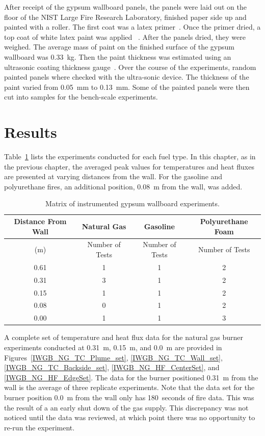 \documentclass[twoside]{uocthesis}
\begin{document}
{After receipt of the gypsum wallboard panels, the panels were laid out on the floor of the NIST Large Fire Research Laboratory, finished paper side up and painted with a roller.  The first coat was a latex primer~\cite{Latex_Primer}.  Once the primer dried, a top coat of white latex paint was applied ~\cite{Latex_Paint}.  After the panels dried, they were weighed. The average mass of paint on the finished surface of the gypsum wallboard was 0.33~kg. Then the paint thickness was estimated using an ultrasonic coating thickness gauge~\cite{defelsko}.  Over the course of the experiments, random painted panels where checked with the ultra-sonic device. The thickness of the paint varied from 0.05~mm to 0.13~mm.  Some of the painted panels were then cut into samples for the bench-scale experiments.


\section{Results}

Table~\ref{tab:IWGB_experiments} lists the experiments conducted for each fuel type.  In this chapter, as in the previous chapter, the averaged peak values for temperatures and heat fluxes are presented at varying distances from the wall.  For the gasoline and polyurethane fires, an additional position, 0.08~m from the wall, was added.

\begin{table}[ht!]
	\centering
	\begin{tabular}{|c|c|c|c|}
		\hline Distance From Wall  	& Natural Gas 		& Gasoline			& Polyurethane Foam \\
		\hline (m) 					& Number of Tests 	& Number of Tests  	& Number of Tests 	\\ 
		\hline 0.61 				& 1 				& 1 				& 2 			 	\\
		\hline 0.31					& 3	 				& 1					& 2 			 	\\
		\hline 0.15					& 1				 	& 1					& 2 			 	\\
		\hline 0.08					& 0 				& 1 				& 2 	 			\\
		\hline 0.00					& 1 				& 1 				& 3 	 			\\
		\hline
	\end{tabular}
	\caption[Matrix of instrumented gypsum wallboard experiments.]{Matrix of instrumented gypsum wallboard experiments.}
	\label{tab:IWGB_experiments}
\end{table}

A complete set of temperature and heat flux data for the natural gas burner experiments conducted at 0.31~m, 0.15~m, and 0.0~m are provided in Figures~\ref{IWGB_NG_TC_Plume_set}, \ref{IWGB_NG_TC_Wall_set}, \ref{IWGB_NG_TC_Backside_set}, \ref{IWGB_NG_HF_CenterSet}, and \ref{IWGB_NG_HF_EdgeSet}.  The data for the burner positioned 0.31~m from the wall is the average of three replicate experiments.  Note that the data set for the burner position 0.0~m from the wall only has 180~seconds of fire data.  This was the result of a an early shut down of the gas supply.  This discrepancy was not noticed until the data was reviewed, at which point there was no opportunity to re-run the experiment.    

}
\end{document}
